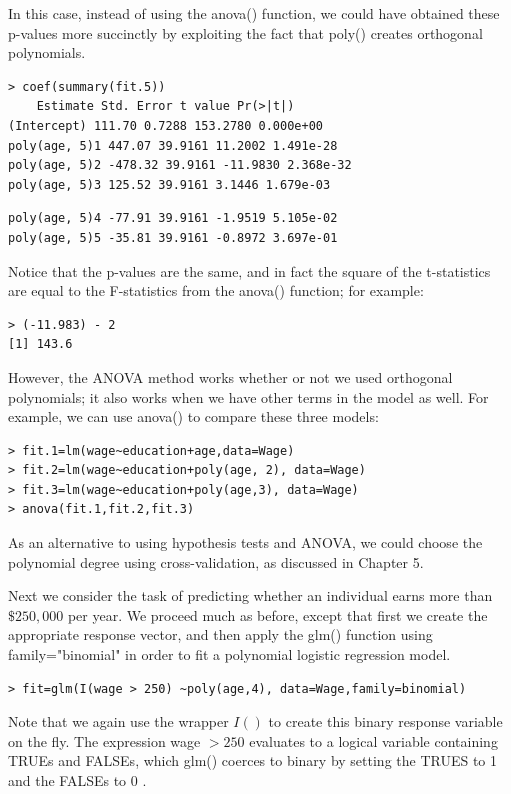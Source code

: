 \documentclass[10pt]{article}
\begin{document}
In this case, instead of using the anova() function, we could have obtained these p-values more succinctly by exploiting the fact that poly() creates orthogonal polynomials.

\begin{verbatim}
> coef(summary(fit.5))
    Estimate Std. Error t value Pr(>|t|)
(Intercept) 111.70 0.7288 153.2780 0.000e+00
poly(age, 5)1 447.07 39.9161 11.2002 1.491e-28
poly(age, 5)2 -478.32 39.9161 -11.9830 2.368e-32
poly(age, 5)3 125.52 39.9161 3.1446 1.679e-03
\end{verbatim}

\begin{verbatim}
poly(age, 5)4 -77.91 39.9161 -1.9519 5.105e-02
poly(age, 5)5 -35.81 39.9161 -0.8972 3.697e-01
\end{verbatim}

Notice that the p-values are the same, and in fact the square of the t-statistics are equal to the F-statistics from the anova() function; for example:

\begin{verbatim}
> (-11.983) - 2
[1] 143.6
\end{verbatim}

However, the ANOVA method works whether or not we used orthogonal polynomials; it also works when we have other terms in the model as well. For example, we can use anova() to compare these three models:

\begin{verbatim}
> fit.1=lm(wage~education+age,data=Wage)
> fit.2=lm(wage~education+poly(age, 2), data=Wage)
> fit.3=lm(wage~education+poly(age,3), data=Wage)
> anova(fit.1,fit.2,fit.3)
\end{verbatim}

As an alternative to using hypothesis tests and ANOVA, we could choose the polynomial degree using cross-validation, as discussed in Chapter 5.

Next we consider the task of predicting whether an individual earns more than $\$ 250,000$ per year. We proceed much as before, except that first we create the appropriate response vector, and then apply the glm() function using family="binomial" in order to fit a polynomial logistic regression model.

\begin{verbatim}
> fit=glm(I(wage > 250) ~poly(age,4), data=Wage,family=binomial)
\end{verbatim}

Note that we again use the wrapper $I()$ to create this binary response variable on the fly. The expression wage $>250$ evaluates to a logical variable containing TRUEs and FALSEs, which glm() coerces to binary by setting the TRUES to 1 and the FALSEs to 0 .
\end{document}
